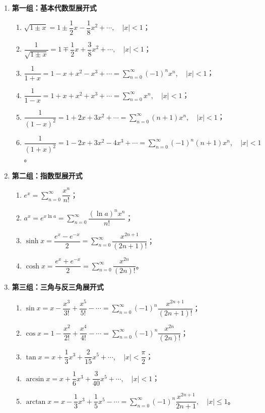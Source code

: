 \begin{enumerate}
    \item \textbf{第一组：基本代数型展开式}
          \begin{enumerate}
              \item $\sqrt{1\pm x} = 1 \pm \dfrac{1}{2}x - \dfrac{1}{8}x^2 + \cdots, \quad |x| < 1$；
              \item $\dfrac{1}{\sqrt{1\pm x}} = 1 \mp \dfrac{1}{2}x + \dfrac{3}{8}x^2 + \cdots, \quad |x| < 1$；
              \item $\dfrac{1}{1+x} = 1 - x + x^2 - x^3 + \cdots = \displaystyle\sum_{n=0}^{\infty}(-1)^n x^n, \quad |x| < 1$；
              \item $\dfrac{1}{1-x} = 1 + x + x^2 + x^3 + \cdots = \displaystyle\sum_{n=0}^{\infty} x^n, \quad |x| < 1$；
              \item $\dfrac{1}{(1-x)^2} = 1 + 2x + 3x^2 + \cdots = \displaystyle\sum_{n=0}^{\infty}(n+1)x^n, \quad |x| < 1$；
              \item $\dfrac{1}{(1+x)^2} = 1 - 2x + 3x^2 - 4x^3 + \cdots = \displaystyle\sum_{n=0}^{\infty}(-1)^n (n+1)x^n, \quad |x| < 1$。
          \end{enumerate}

    \item \textbf{第二组：指数型展开式}
          \begin{enumerate}
              \item $e^x = \displaystyle\sum_{n=0}^{\infty} \dfrac{x^n}{n!}$；
              \item $a^x = e^{x\ln a} = \displaystyle\sum_{n=0}^{\infty} \dfrac{(\ln a)^n x^n}{n!}$；
              \item $\sinh x = \dfrac{e^x - e^{-x}}{2} = \displaystyle\sum_{n=0}^{\infty} \dfrac{x^{2n+1}}{(2n+1)!}$；
              \item $\cosh x = \dfrac{e^x + e^{-x}}{2} = \displaystyle\sum_{n=0}^{\infty} \dfrac{x^{2n}}{(2n)!}$。
          \end{enumerate}

    \item \textbf{第三组：三角与反三角展开式}
          \begin{enumerate}
              \item $\sin x = x - \dfrac{x^3}{3!} + \dfrac{x^5}{5!} - \cdots = \displaystyle\sum_{n=0}^{\infty} (-1)^n \dfrac{x^{2n+1}}{(2n+1)!}$；
              \item $\cos x = 1 - \dfrac{x^2}{2!} + \dfrac{x^4}{4!} - \cdots = \displaystyle\sum_{n=0}^{\infty} (-1)^n \dfrac{x^{2n}}{(2n)!}$；
              \item $\tan x = x + \dfrac{1}{3}x^3 + \dfrac{2}{15}x^5 + \cdots, \quad |x| < \dfrac{\pi}{2}$；
              \item $\arcsin x = x + \dfrac{1}{6}x^3 + \dfrac{3}{40}x^5 + \cdots, \quad |x| < 1$；
              \item $\arctan x = x - \dfrac{1}{3}x^3 + \dfrac{1}{5}x^5 - \cdots = \displaystyle\sum_{n=0}^{\infty} (-1)^n \dfrac{x^{2n+1}}{2n+1}, \quad |x| \le 1$。
          \end{enumerate}


\end{enumerate}
